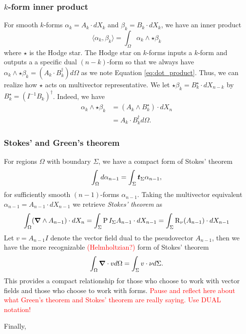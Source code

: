 \subsubsection{$k$-form inner product}
For smooth $k$-forms $\alpha_k = A_k \cdot dX_k$ and $\beta_k = B_k \cdot dX_k$, we have an inner product 
\[
\langle \alpha_k, \beta_k \rangle = \int_\Omega \alpha_k \wedge \star \beta_k 
\]
where $\star$ is the Hodge star. The Hodge star on $k$-forms inputs a $k$-form and outputs a a specific dual $(n-k)$-form so that we always have $\alpha_k \wedge \star \beta_k  = (A_k\cdot B_k^\dagger)d\Omega$ as we note Equation \ref{eq:dot_product}. Thus, we can realize how $\star$ acts on multivector representative. We let $\star \beta_k = B_k^\star \cdot dX_{n-k}$ by $B_k^\star = (I^{-1} B_k)^\dagger$.  Indeed, we have
\begin{align*}
    \alpha_k \wedge \star \beta_k &= (A_k \wedge B_k^\star) \cdot dX_n\\
    &= A_k \cdot B_k^\dagger d\Omega.
\end{align*}

\subsubsection{Stokes' and Green's theorem}

For regions $\Omega$ with boundary $\Sigma$, we have a compact form of Stokes' theorem
\[
\int_\Omega d \alpha_{n-1} = \int_\Sigma \boldsymbol{t}_\Sigma \alpha_{n-1},
\]
for sufficiently smooth $(n-1)$-forms $\alpha_{n-1}$. Taking the multivector equivalent $\alpha_{n-1} = A_{n-1} \cdot dX_{n-1}$ we retrieve \emph{Stokes' theorem} as
\[
\int_\Omega (\boldsymbol{\nabla} \wedge A_{n-1}) \cdot dX_n = \int_\Sigma \operatorname{P}{I_\Sigma}{A_{n-1}} \cdot dX_{n-1}  = \int_\Sigma \operatorname{R}_{\nu}(A_{n-1}) \cdot dX_{n-1}
\]
Let $v = A_{n-1} I$ denote the vector field dual to the pseudovector $A_{n-1}$, then we have the more recognizable \textcolor{red}{(Helmholtzian?)} form of Stokes' theorem
\[
\int_\Omega \boldsymbol{\nabla} \cdot v d\Omega = \int_\Sigma v \cdot \nu d\Sigma.
\]
 This provides a compact relationship for those who choose to work with vector fields and those who choose to work with forms. \textcolor{red}{Pause and reflect here about what Green's theorem and Stokes' theorem are really saying. Use DUAL notation!}

Finally,




